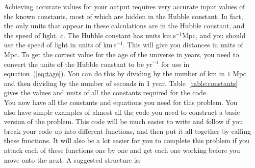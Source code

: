 \documentclass[]{article}
\begin{document}
\noindent Achieving accurate values for your output requires very accurate input values of the known constants, most of which are hidden in the Hubble constant. In fact, the only units that appear in these calculations are in the Hubble constant, and the speed of light, $c$. The Hubble constant has units km$\,$s$^{-1}$Mpc, and you should use the speed of light in units of km$\,$s$^{-1}$. This will give you distances in units of Mpc. To get the correct value for the age of the universe in years, you need to convert the units of the Hubble constant to be yr$^{-1}$ for use in equation~(\ref{eq:tage}). You can do this by dividing by the number of km in $1$ Mpc and then dividing by the number of seconds in 1 year.  Table~\ref{table:constants} gives the values and units of all the constants required for the code. \\

\noindent You now have all the constants and equations you need for this problem. You also have simple examples of almost all the code you need to construct a basic version of the problem. This code will be much easier to write and follow if you break your code up into different functions, and then put it all together by calling these functions. It will also be a lot easier for you to complete this problem if you attack each of these functions one by one and get each one working before you move onto the next. A suggested structure is:
\end{document}
